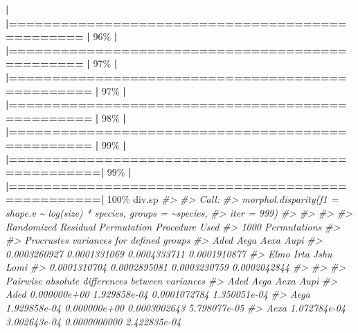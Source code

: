 \documentclass[
]{book}
\newenvironment{Shaded}{\begin{snugshade}}{\end{snugshade}}
\newcommand{\CommentTok}[1]{\textcolor[rgb]{0.56,0.35,0.01}{\textit{#1}}}
\newcommand{\DecValTok}[1]{\textcolor[rgb]{0.00,0.00,0.81}{#1}}
\newcommand{\ErrorTok}[1]{\textcolor[rgb]{0.64,0.00,0.00}{\textbf{#1}}}
\newcommand{\NormalTok}[1]{#1}
\newcommand{\SpecialCharTok}[1]{\textcolor[rgb]{0.81,0.36,0.00}{\textbf{#1}}}
\begin{document}
\begin{Shaded}
\begin{Highlighting}[]
  \SpecialCharTok{|}                                                        
  \ErrorTok{|================================================}  \ErrorTok{|}  \DecValTok{96}\NormalTok{\%}
  \SpecialCharTok{|}                                                        
  \ErrorTok{|================================================}  \ErrorTok{|}  \DecValTok{97}\NormalTok{\%}
  \SpecialCharTok{|}                                                        
  \ErrorTok{|=================================================} \ErrorTok{|}  \DecValTok{97}\NormalTok{\%}
  \SpecialCharTok{|}                                                        
  \ErrorTok{|=================================================} \ErrorTok{|}  \DecValTok{98}\NormalTok{\%}
  \SpecialCharTok{|}                                                        
  \ErrorTok{|=================================================} \ErrorTok{|}  \DecValTok{99}\NormalTok{\%}
  \SpecialCharTok{|}                                                        
  \ErrorTok{|==================================================|}  \DecValTok{99}\NormalTok{\%}
  \SpecialCharTok{|}                                                        
  \ErrorTok{|==================================================|} \DecValTok{100}\NormalTok{\%}
\NormalTok{div.sp}
\CommentTok{\#\textgreater{} }
\CommentTok{\#\textgreater{} Call:}
\CommentTok{\#\textgreater{} morphol.disparity(f1 = shape.v \textasciitilde{} log(size) * species, groups = \textasciitilde{}species,  }
\CommentTok{\#\textgreater{}     iter = 999) }
\CommentTok{\#\textgreater{} }
\CommentTok{\#\textgreater{} }
\CommentTok{\#\textgreater{} }
\CommentTok{\#\textgreater{} Randomized Residual Permutation Procedure Used}
\CommentTok{\#\textgreater{} 1000 Permutations}
\CommentTok{\#\textgreater{} }
\CommentTok{\#\textgreater{} Procrustes variances for defined groups}
\CommentTok{\#\textgreater{}         Aded         Aega         Aexa         Aupi }
\CommentTok{\#\textgreater{} 0.0003260927 0.0001331069 0.0004333711 0.0001910877 }
\CommentTok{\#\textgreater{}         Elmo         Irta         Jshu         Lomi }
\CommentTok{\#\textgreater{} 0.0001310704 0.0002895081 0.0003230759 0.0002042844 }
\CommentTok{\#\textgreater{} }
\CommentTok{\#\textgreater{} }
\CommentTok{\#\textgreater{} Pairwise absolute differences between variances}
\CommentTok{\#\textgreater{}              Aded         Aega         Aexa         Aupi}
\CommentTok{\#\textgreater{} Aded 0.000000e+00 1.929858e{-}04 0.0001072784 1.350051e{-}04}
\CommentTok{\#\textgreater{} Aega 1.929858e{-}04 0.000000e+00 0.0003002643 5.798077e{-}05}
\CommentTok{\#\textgreater{} Aexa 1.072784e{-}04 3.002643e{-}04 0.0000000000 2.422835e{-}04}

\end{Highlighting}
\end{Shaded}
\end{document}
